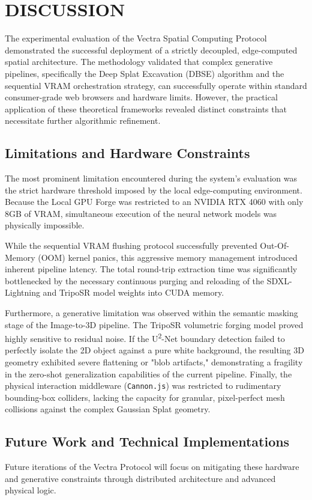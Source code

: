 \section{DISCUSSION}

The experimental evaluation of the Vectra Spatial Computing Protocol demonstrated the successful deployment of a strictly decoupled, edge-computed spatial architecture. The methodology validated that complex generative pipelines, specifically the Deep Splat Excavation (DBSE) algorithm and the sequential VRAM orchestration strategy, can successfully operate within standard consumer-grade web browsers and hardware limits. However, the practical application of these theoretical frameworks revealed distinct constraints that necessitate further algorithmic refinement.

\subsection{Limitations and Hardware Constraints}
The most prominent limitation encountered during the system's evaluation was the strict hardware threshold imposed by the local edge-computing environment. Because the Local GPU Forge was restricted to an NVIDIA RTX 4060 with only 8GB of VRAM, simultaneous execution of the neural network models was physically impossible. 

While the sequential VRAM flushing protocol successfully prevented Out-Of-Memory (OOM) kernel panics, this aggressive memory management introduced inherent pipeline latency. The total round-trip extraction time was significantly bottlenecked by the necessary continuous purging and reloading of the SDXL-Lightning and TripoSR model weights into CUDA memory. 

Furthermore, a generative limitation was observed within the semantic masking stage of the Image-to-3D pipeline. The TripoSR volumetric forging model proved highly sensitive to residual noise. If the U\textsuperscript{2}-Net boundary detection failed to perfectly isolate the 2D object against a pure white background, the resulting 3D geometry exhibited severe flattening or "blob artifacts," demonstrating a fragility in the zero-shot generalization capabilities of the current pipeline. Finally, the physical interaction middleware (\texttt{Cannon.js}) was restricted to rudimentary bounding-box colliders, lacking the capacity for granular, pixel-perfect mesh collisions against the complex Gaussian Splat geometry.

\subsection{Future Work and Technical Implementations}
Future iterations of the Vectra Protocol will focus on mitigating these hardware and generative constraints through distributed architecture and advanced physical logic. 

